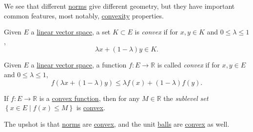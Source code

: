 We see that different \hyperref[def:norm]{norms} give different geometry, but they have important common features, most notably, \hyperref[def:convex-function]{convexity} properties.

\begin{definition}\label{def:convex-set}
	Given \(E\) a \hyperref[def:linear-vector-space]{linear vector space}, a set \(K\subset E\) is \emph{convex} if for \(x, y\in K\) and \(0 \leq \lambda \leq 1\),
	\[
		\lambda x + (1 - \lambda )y\in K.
	\]
\end{definition}

\begin{definition}\label{def:convex-function}
	Given \(E\) a \hyperref[def:linear-vector-space]{linear vector space}, a function \(f\colon E\to \mathbb{R} \) is called \emph{convex} if for \(x, y\in E\) and \(0 \leq \lambda \leq 1\),
	\[
		f(\lambda x + (1 - \lambda )y) \leq \lambda f(x) + (1 - \lambda )f(y).
	\]
\end{definition}

\begin{remark}
	If \(f\colon E \to \mathbb{R} \) is a \hyperref[def:convex-function]{convex function}, then for any \(M\in \mathbb{R} \) the \emph{sublevel set} \(\left\{ x\in E\mid f(x) \leq M \right\} \) is \hyperref[def:convex-set]{convex}.
\end{remark}

The upshot is that \hyperref[def:norm]{norms} are \hyperref[def:convex-function]{convex}, and the unit \hyperref[def:ball]{balls} are \hyperref[def:convex-set]{convex} as well.
